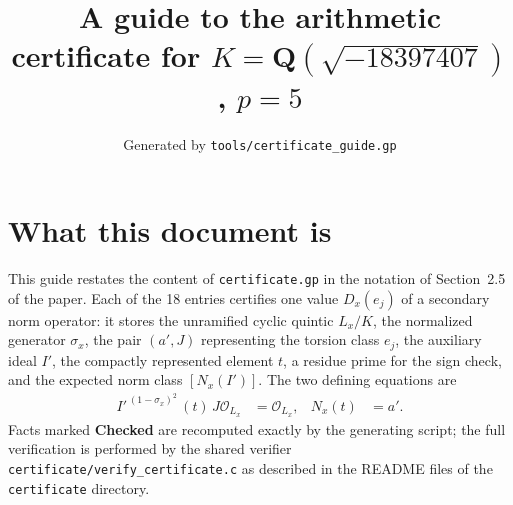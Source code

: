 \documentclass[11pt]{article}
\title{A guide to the arithmetic certificate for $K=\mathbf Q(\sqrt{-18397407})$, $p=5$}
\author{}
\date{Generated by \texttt{tools/certificate\_guide.gp}}
\begin{document}
\maketitle
\section*{What this document is}
This guide restates the content of \texttt{certificate.gp} in the
notation of Section~2.5 of the paper.  Each of the 18 entries
certifies one value $D_x(e_j)$ of a secondary norm operator: it
stores the unramified cyclic quintic $L_x/K$, the normalized
generator $\sigma_x$, the pair $(a',J)$ representing the torsion
class $e_j$, the auxiliary ideal $I'$, the compactly represented
element $t$, a residue prime for the sign check, and the expected
norm class $[N_x(I')]$.  The two defining equations are
\begin{align*}
I'^{\,(1-\sigma_x)^2}\,(t)\,J\mathcal O_{L_x}&=\mathcal O_{L_x},&
N_x(t)&=a'.
\end{align*}
Facts marked \textbf{Checked} are recomputed exactly by the
generating script; the full verification is performed by the
shared verifier \texttt{certificate/verify\_certificate.c} as
described in the README files of the \texttt{certificate}
directory.
\end{document}
